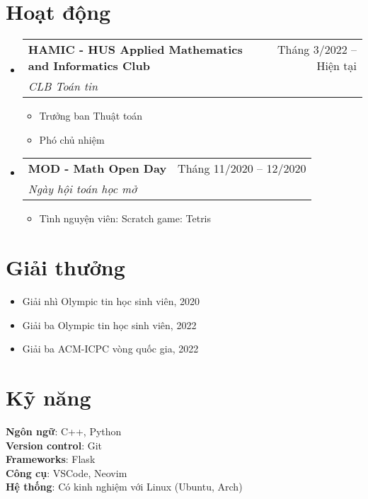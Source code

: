 \documentclass[letterpaper,11pt]{article}
\makeatletter
\newcommand{\resumeItem}[1]{
  \item\small{
    {#1 \vspace{-2pt}}
  }
}
\newcommand{\resumeSubheading}[4]{
  \vspace{-2pt}\item
    \begin{tabular*}{0.97\textwidth}[t]{l@{\extracolsep{\fill}}r}
      \textbf{#1} & #2 \\
      \textit{\small#3} & \textit{\small #4} \\
    \end{tabular*}\vspace{-7pt}
}
\newcommand{\resumeSubHeadingListStart}{\begin{itemize}[leftmargin=0.15in, label={}]}
\newcommand{\resumeSubHeadingListEnd}{\end{itemize}}
\newcommand{\resumeItemListStart}{\begin{itemize}}
\newcommand{\resumeItemListEnd}{\end{itemize}\vspace{-5pt}}
\makeatother
\begin{document}
\section{Hoạt động}
  \resumeSubHeadingListStart

    \resumeSubheading
      {HAMIC - HUS Applied Mathematics and Informatics Club}{Tháng 3/2022 – Hiện tại}
      {CLB Toán tin}{}
      \resumeItemListStart
        \resumeItem{Trưởng ban Thuật toán}
        \resumeItem{Phó chủ nhiệm}
      \resumeItemListEnd
      
    \resumeSubheading
      {MOD - Math Open Day}{Tháng 11/2020 – 12/2020}
      {Ngày hội toán học mở}{}
      \resumeItemListStart
        \resumeItem{Tình nguyện viên: Scratch game: Tetris}
      \resumeItemListEnd

    \resumeSubHeadingListEnd

\section{Giải thưởng}

    \begin{itemize}
        \item Giải nhì Olympic tin học sinh viên, 2020
        \item Giải ba Olympic tin học sinh viên, 2022
        \item Giải ba ACM-ICPC vòng quốc gia, 2022
    \end{itemize}


%
\section{Kỹ năng}
 \begin{itemize}[leftmargin=0.15in, label={}]
    \small{\item{
     \textbf{Ngôn ngữ}{: C++, Python} \\
     \textbf{Version control}{: Git} \\
     \textbf{Frameworks}{: Flask} \\
     \textbf{Công cụ}{: VSCode, Neovim} \\
     \textbf{Hệ thống}{: Có kinh nghiệm với Linux (Ubuntu, Arch)} \\
    }}
 \end{itemize}


\end{document}
